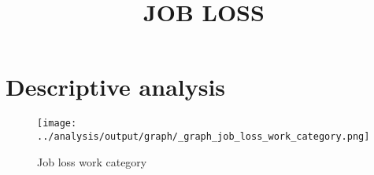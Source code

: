 \documentclass[a4paper]{article}
\date{\displaydate{date} }
\title{\LARGE JOB LOSS}
\begin{document}
\maketitle

\section{Descriptive analysis}\label{sec:desc_pam}



\begin{figure}[hb]
  \centering
  \caption{Job loss work category}
  \texttt{[image: ../analysis/output/graph/\_graph\_job\_loss\_work\_category.png]}
  \label{fig:_graph_job_loss_work_category}
\end{figure}
\end{document}
